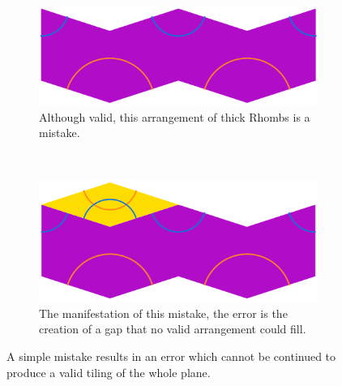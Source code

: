 \documentclass[
  oneside,
  11pt, a4paper,
  footinclude=true,
  headinclude=true,
  cleardoublepage=empty
]{scrbook}
\begin{document}
\begin{figure}[h]
\centering
\begin{subfigure}{0.6\textwidth}
\includegraphics[width=\textwidth]{Mistake}
\caption{Although valid, this arrangement of thick Rhombs is a mistake.}
\label{fig:mistake}
\end{subfigure}\\
\begin{subfigure}{0.6\textwidth}
\includegraphics[width=\textwidth]{MistakeNext}
\caption{The manifestation of this mistake, the error is the creation of a gap that no valid arrangement could fill.}
\label{fig:error}
\end{subfigure}
\caption[A Simple Mistake]{A simple mistake results in an error which cannot be continued to produce a valid tiling of the whole plane.}
\label{fig:mistakes}
\end{figure}
\end{document}

